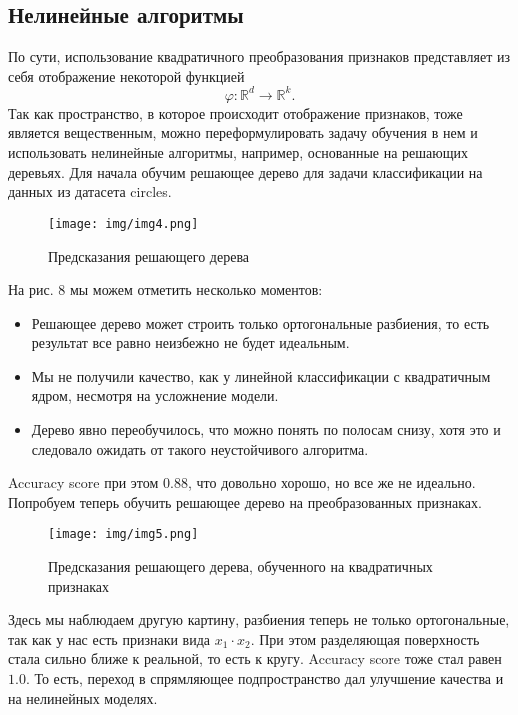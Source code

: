 \documentclass[twoside,twocolumn]{article}
\theoremstyle{plain}
\theoremstyle{definition}
\begin{document}
\subsection{Нелинейные алгоритмы}
По сути, использование квадратичного преобразования признаков представляет из себя отображение некоторой функцией
$$
\varphi : \mathbb{R}^d \rightarrow \mathbb{R}^k.
$$
Так как пространство, в которое происходит отображение признаков, тоже является вещественным, можно переформулировать задачу обучения в нем и использовать
нелинейные алгоритмы, например, основанные на решающих деревьях. Для начала обучим решающее дерево для задачи классификации на данных из датасета circles.
\begin{figure}[!h]
  \caption{Предсказания решающего дерева}
  \centering
  \texttt{[image: img/img4.png]}
  \label{fig:circles4}
\end{figure}
На рис. 8 мы можем отметить несколько моментов:
\begin{itemize}
  \item Решающее дерево может строить только ортогональные разбиения, то есть результат все равно неизбежно не будет идеальным.
  \item Мы не получили качество, как у линейной классификации с квадратичным ядром, несмотря на усложнение модели.
  \item Дерево явно переобучилось, что можно понять по полосам снизу, хотя это и следовало ожидать от такого неустойчивого алгоритма.
\end{itemize}
Accuracy score при этом $0.88$, что довольно хорошо, но все же не идеально. Попробуем теперь обучить решающее дерево на
преобразованных признаках.
\begin{figure}[!h]
  \caption{Предсказания решающего дерева, обученного на квадратичных признаках}
  \centering
  \texttt{[image: img/img5.png]}
  \label{fig:circles5}
\end{figure}
Здесь мы наблюдаем другую картину, разбиения теперь не только ортогональные, так как у нас есть признаки вида $x_1 \cdot x_2$.
При этом разделяющая поверхность стала сильно ближе к реальной, то есть к кругу. Accuracy score тоже стал равен $1.0$. То есть, переход
в спрямляющее подпространство дал улучшение качества и на нелинейных моделях.
\end{document}
